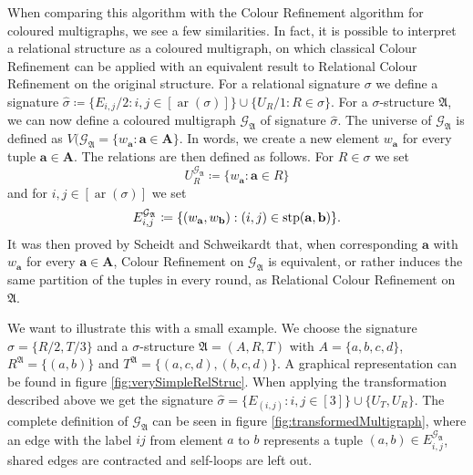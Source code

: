 When comparing this algorithm with the Colour Refinement algorithm for coloured multigraphs, we see a few similarities.
In fact, it is possible to interpret a relational structure as a coloured multigraph, on which classical Colour Refinement can be applied with an equivalent result to Relational Colour Refinement on the original structure.
For a relational signature $\sigma$ we define a signature $\widehat{\sigma}\coloneqq \{E_{i,j}/2 : i,j \in [\operatorname{ar}(\sigma)]\} \cup \{U_R/1 : R\in \sigma\}$.
For a $\sigma$-structure $\mathfrak A$, we can now define a coloured multigraph $\mathcal{G}_{\mathfrak A}$ of signature $\widehat{\sigma}$.
The universe of $\mathcal{G}_{\mathfrak A}$ is defined as $V(\mathcal{G}_{\mathfrak A}=\{w_{\mathbf a} : \mathbf a \in \mathbf A\}$.
In words, we create a new element $w_{\mathbf a}$ for every tuple $\mathbf a \in \mathbf A$.
The relations are then defined as follows.
For $R\in \sigma$ we set 
$$U_R^{\mathcal{G}_{\mathfrak A}}\coloneqq \{w_{\mathbf a} : \mathbf a \in R\}$$ 
and for $i,j \in [\operatorname{ar}(\sigma)]$ we set 
$$E_{i,j}^{\mathcal{G}_{\mathfrak A}}\coloneqq \{(w_{\mathbf a}, w_{\mathbf b}) : (i, j) \in \operatorname{stp}(\mathbf a, \mathbf b)\}.$$
It was then proved by Scheidt and Schweikardt \cite{scheidt2025ColorRefinement} that, when corresponding $\mathbf a$ with $w_{\mathbf a}$ for every $\mathbf a\in \mathbf A$, Colour Refinement on $\mathcal{G}_{\mathfrak A}$ is equivalent, or rather induces the same partition of the tuples in every round, as Relational Colour Refinement on $\mathfrak A$.

We want to illustrate this with a small example.
We choose the signature $\sigma=\{R/2, T/3\}$ and a $\sigma$-structure $\mathfrak A=(A,R,T)$ with $A=\{a,b,c,d\}$, $R^{\mathfrak A}=\{(a,b)\}$ and $T^{\mathfrak A}=\{(a,c,d),(b,c,d)\}$.
A graphical representation can be found in figure \ref{fig:verySimpleRelStruc}.
When applying the transformation described above we get the signature $\widehat{\sigma}=\{E_{(i,j)} : i,j \in [3]\}\cup\{U_T, U_R\}$.
The complete definition of $\mathcal{G}_{\mathfrak A}$ can be seen in figure \ref{fig:transformedMultigraph}, where an edge with the label $ij$ from element $a$ to $b$ represents a tuple $(a,b)\in E_{i,j}^{\mathcal{G}_{\mathfrak A}}$, shared edges are contracted and self-loops are left out.

